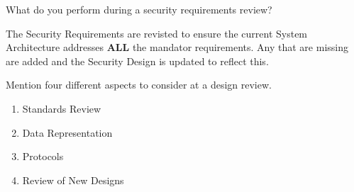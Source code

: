 \begin{questions}
\question{} What do you perform during a security requirements review?
  \begin{solution}
    The Security Requirements are revisted to ensure the current System Architecture addresses \textbf{ALL} the mandator requirements.
    Any that are missing are added and the Security Design is updated to reflect this.
  \end{solution}

\question{} Mention four different aspects to consider at a design review.
  \begin{solution}
    \begin{enumerate}[noitemsep]
    \item Standards Review
    \item Data Representation
    \item Protocols
    \item Review of New Designs
    \end{enumerate}
  \end{solution}

  \begin{parts}

\end{parts}
\end{questions}
